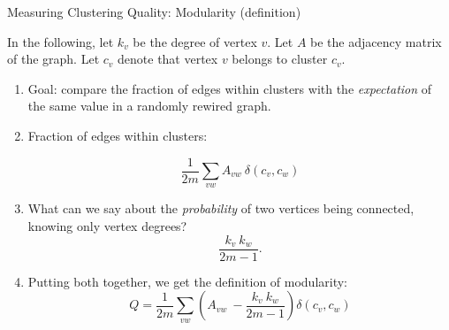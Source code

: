 \begin{frame}[label=measuring-clustering-quality-modularity-definition]{Measuring Clustering Quality: Modularity (definition)}

In the following, let $k_v$ be the degree of vertex $v$. Let $A$ be the adjacency matrix of the graph. Let $c_v$ denote that vertex $v$ belongs to cluster $c_v$.

\begin{enumerate}
 \item<1-> Goal: compare the fraction of edges within clusters with the \emph{expectation} of the same value in a randomly rewired graph.
 \item<2-> Fraction of edges within clusters:

  \begin{equation}
      \frac{1}{2m} \sum_{vw} A_{vw}\ \delta(c_v, c_w)
  \label{eqn:fraction_of_edges_within_cluster}
  \end{equation}

  \item<3-> What can we say about the \emph{probability} of two vertices being connected, knowing only vertex degrees?
  \begin{equation}
    \frac{k_v\ k_w}{2m-1}.
  \label{eqn:randomly_rewired_graph_probabilities}
  \end{equation}

  \item<4-> Putting both together, we get the definition of modularity:
  \begin{equation}
    Q = \frac{1}{2m} \sum_{vw} (A_{vw}\ - \frac{k_v\ k_w}{2m-1}) \delta(c_v, c_w)
  \label{eqn:modularity}
  \end{equation}
\end{enumerate}
\end{frame}
